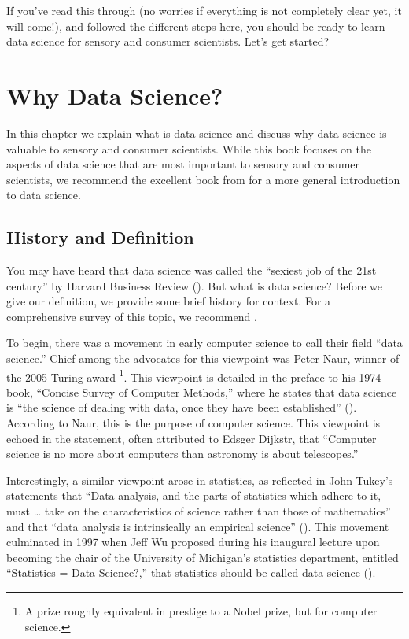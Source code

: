 \documentclass[
]{krantz}
\renewenvironment{quote}{\begin{VF}}{\end{VF}}
\begin{document}
If you've read this through (no worries if everything is not completely clear yet, it will come!), and followed the different steps here, you should be ready to learn data science for sensory and consumer scientists. Let's get started?

\hypertarget{data_science}{%
\chapter{Why Data Science?}\label{data_science}}

\begin{quote}
In this chapter we explain what is data science and discuss why data science is valuable to sensory and consumer scientists. While this book focuses on the aspects of data science that are most important to sensory and consumer scientists, we recommend the excellent book from \citet{Wickham2016} for a more general introduction to data science.
\end{quote}

\hypertarget{history-and-definition}{%
\section{History and Definition}\label{history-and-definition}}

You may have heard that data science was called the ``sexiest job of the 21st century'' by Harvard Business Review (\citet{Davenport2012}). But what is data science? Before we give our definition, we provide some brief history for context. For a comprehensive survey of this topic, we recommend \citet{Cao2017}.

To begin, there was a movement in early computer science to call their field ``data science.'' Chief among the advocates for this viewpoint was Peter Naur, winner of the 2005 Turing award \footnote{A prize roughly equivalent in prestige to a Nobel prize, but for computer science.}. This viewpoint is detailed in the preface to his 1974 book, ``Concise Survey of Computer Methods,'' where he states that data science is ``the science of dealing with data, once they have been established'' (\citet{Naur1974}). According to Naur, this is the purpose of computer science. This viewpoint is echoed in the statement, often attributed to Edsger Dijkstr, that ``Computer science is no more about computers than astronomy is about telescopes.''

Interestingly, a similar viewpoint arose in statistics, as reflected in John Tukey's statements that ``Data analysis, and the parts of statistics which adhere to it, must \ldots{} take on the characteristics of science rather than those of mathematics'' and that ``data analysis is intrinsically an empirical science'' (\citet{Tukey1962}). This movement culminated in 1997 when Jeff Wu proposed during his inaugural lecture upon becoming the chair of the University of Michigan's statistics department, entitled ``Statistics = Data Science?,'' that statistics should be called data science (\citet{Wu1997}).
\end{document}
